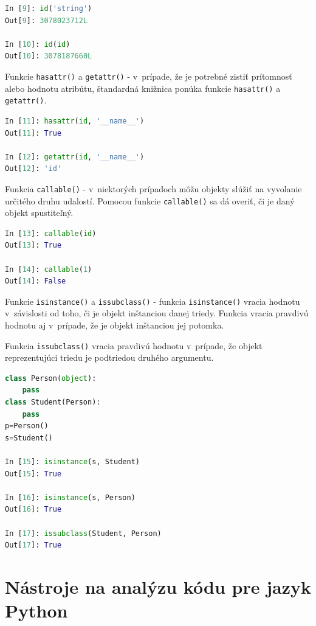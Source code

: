 \documentclass[11pt,oneside,final]{fithesis2}
\begin{document}
\begin{list}{•}{}
\begin{lstlisting}[language=python]	
In [9]: id('string')
Out[9]: 3078023712L

In [10]: id(id)
Out[10]: 3078187660L
\end{lstlisting}

		\item Funkcie \texttt{hasattr()} a \texttt{getattr()} -
		v~prípade, že je potrebné zistiť prítomnosť alebo hodnotu atribútu, štandardná knižnica ponúka funkcie \texttt{hasattr()} a \texttt{getattr()}.

\begin{lstlisting}[language=python]	
In [11]: hasattr(id, '__name__')
Out[11]: True

In [12]: getattr(id, '__name__')
Out[12]: 'id'
\end{lstlisting}		

		\item Funkcia \texttt{callable()} -
		v~niektorých prípadoch môžu objekty slúžiť na vyvolanie určitého druhu udalostí. Pomocou funkcie \texttt{callable()} sa dá overiť, či je daný objekt spustiteľný.

\begin{lstlisting}[language=python]	
In [13]: callable(id)
Out[13]: True

In [14]: callable(1)
Out[14]: False
\end{lstlisting}			


		\item Funkcie \texttt{isinstance()} a \texttt{issubclass()} - 
		funkcia \texttt{isinstance()} vracia hodnotu v~závislosti od toho, či je objekt inštanciou danej triedy. Funkcia vracia pravdivú hodnotu aj v~prípade, že je objekt inštanciou jej potomka.
		
		Funkcia \texttt{issubclass()} vracia pravdivú hodnotu v~prípade, že objekt reprezentujúci triedu je podtriedou druhého argumentu.

\begin{lstlisting}[language=python]	
class Person(object):
    pass
class Student(Person):
    pass
p=Person()
s=Student()

In [15]: isinstance(s, Student)
Out[15]: True

In [16]: isinstance(s, Person)
Out[16]: True

In [17]: issubclass(Student, Person)
Out[17]: True
\end{lstlisting}		

\end{list}


\chapter{Nástroje na analýzu kódu pre jazyk Python}
\end{document}
